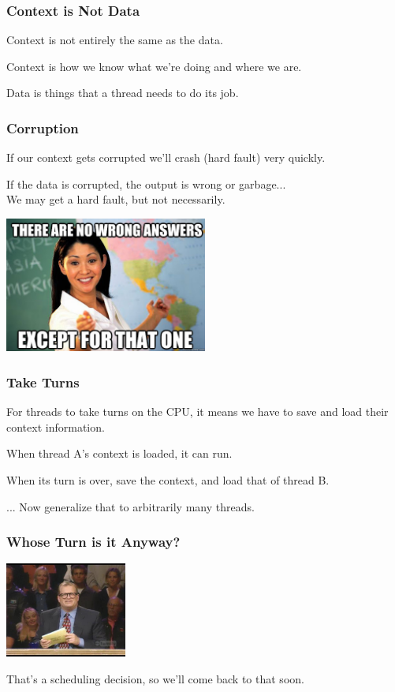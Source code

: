 \begin{frame}
\frametitle{Context is Not Data}

Context is not entirely the same as the data.

Context is how we know what we're doing and where we are.

Data is things that a thread needs to do its job.


\end{frame}


\begin{frame}
\frametitle{Corruption}

If our context gets corrupted we'll crash (hard fault) very quickly.

If the data is corrupted, the output is wrong or garbage...\\
\quad We may get a hard fault, but not necessarily.

\begin{center}
	\includegraphics[width=0.5\textwidth]{images/wronganswer.jpg}
\end{center}

\end{frame}



\begin{frame}
\frametitle{Take Turns}

For threads to take turns on the CPU, it means we have to save and load their context information. 

When thread A's context is loaded, it can run.

When its turn is over, save the context, and load that of thread B.

... Now generalize that to arbitrarily many threads.


\end{frame}


\begin{frame}
\frametitle{Whose Turn is it Anyway?}

\begin{center}
	\includegraphics[width=0.3\textwidth]{images/whoseturn.jpg}
\end{center}

That's a scheduling decision, so we'll come back to that soon.


\end{frame}


